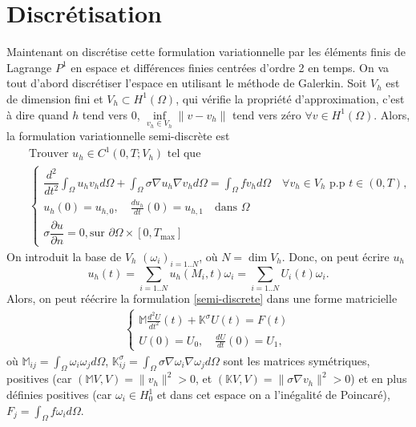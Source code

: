\documentclass[12pt]{article}
\newcommand{\pd}[2]{ %
	\dfrac{\partial #1}{\partial #2}
}
\begin{document}
	\section{Discrétisation}
	Maintenant on discrétise cette formulation variationnelle par les éléments finis de Lagrange $P^1$ en espace et différences finies centrées d’ordre 2 en temps. On va tout d'abord discrétiser l'espace en utilisant le méthode de Galerkin. Soit $V_h$ est de dimension fini et $V_h \subset H^1(\Omega)$, qui vérifie la propriété d'approximation, c'est à dire quand $h$ tend vers 0, $\underset{v_h\in V_h}{\inf}\|v - v_h\|$ tend vers zéro $\forall v \in H^1(\Omega)$. Alors, la formulation variationnelle semi-discrète est
	\begin{eqnarray}
	\nonumber
	& &\text{Trouver } u_h \in C^1(0, T; V_h) \text{ tel que}\\[2mm]
	\label{semi-discrete}
	& &\begin{cases}
	\dfrac{d^2}{dt^2} \int_\Omega {u_h v_h d\Omega} + \int_\Omega{\sigma \nabla u_h \nabla v_h d\Omega} = \int_\Omega{f v_h d\Omega} \quad \forall v_h \in V_h \text{ p.p } t \in (0,T),\\
	u_h(0) = u_{h,0}, \quad \frac{d u_h}{dt}(0) = u_{h,1} \quad \text{dans } \Omega \\
	\sigma \pd{u}{n} = 0, \text{sur } \partial\Omega \times [0, T_\text{max}]
	\end{cases}
	\end{eqnarray}
	On introduit la base de $V_h$ $(\omega_i)_{i = 1..N}$, où $N = \dim{V_h}$. Donc, on peut écrire $u_h$
	\begin{equation*}
	u_h(t) = \sum_{i = 1..N}{u_h(M_i, t)\omega_i} = \sum_{i = 1..N}{U_i(t)\omega_i}.
	\end{equation*} 
	Alors, on peut réécrire la formulation \eqref{semi-discrete} dans une forme matricielle
	\begin{eqnarray}
	\begin{cases} \label{matr_semi_discrete}
	\mathbb{M}\frac{d^2U}{dt^2}(t) + \mathbb{K}^\sigma U(t) = F(t)\\
	U(0) = U_0, \quad \frac{dU}{dt}(0) = U_1,
	\end{cases}
	\end{eqnarray}
	où $\mathbb{M}_{ij} = \int_\Omega{\omega_i \omega_j d\Omega}$, $\mathbb{K}_{ij}^\sigma = \int_\Omega{\sigma\nabla\omega_i \nabla\omega_j d\Omega}$ sont les matrices symétriques, positives (car $(\mathbb{M}V,V) = \|v_h\|^2 > 0$, et $(\mathbb{K}V,V) = \|\sigma\nabla v_h\|^2 > 0$) et en plus définies positives (car $\omega_i \in H^1_0$ et dans cet espace on a l'inégalité de Poincaré), $F_j = \int_{\Omega}{f\omega_i d\Omega}$.
	
\end{document}
